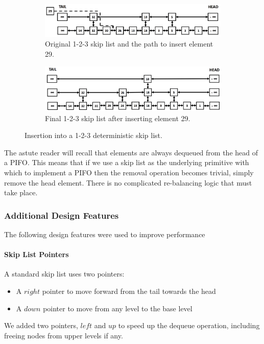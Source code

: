 \begin{figure}[t!] %
\centering
\begin{subfigure}{\linewidth}
\centering
\includegraphics[width=0.8\linewidth]{figures/design/skip-list-a}
\caption{Original 1-2-3 skip list and the path to insert element 29.} \label{fig:skip-list-a}
\end{subfigure}\hspace*{\fill}

\medskip
\begin{subfigure}{\linewidth}
\centering
\includegraphics[width=0.8\linewidth]{figures/design/skip-list-b}
\caption{Final 1-2-3 skip list after inserting element 29.} \label{fig:skip-list-b}
\end{subfigure}\hspace*{\fill}

\caption{Insertion into a 1-2-3 deterministic skip list.}\label{fig:skip-list}
\vspace{-1.0em}
\end{figure}

The astute reader will recall that elements are always dequeued from the head of a PIFO. This means that if we use a skip list as the underlying primitive with which to implement a PIFO then the removal operation becomes trivial, simply remove the head element.  There is no complicated re-balancing logic that must take place.

\subsubsection{Additional Design Features}\label{sec:add-features}
The following design features were used to improve performance
\paragraph{Skip List Pointers}
A standard skip list uses two pointers:
\begin{itemize}
\item A $right$ pointer to move forward from the tail towards the head
\item A $down$ pointer to move from any level to the base level
\end{itemize}
We added two pointers, $left$ and $up$ to speed up the dequeue operation, including freeing nodes from upper levels if any.

